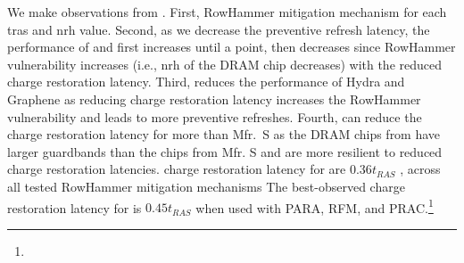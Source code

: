 We make  observations from . 
First, \Xh{}    RowHammer mitigation mechanism for each  \gls{tras} and \gls{nrh} value. 
Second, as we decrease the preventive refresh latency, the performance of \Xh{} and \Xs{} first increases until a point, then decreases since RowHammer vulnerability increases (i.e., \gls{nrh} of the DRAM chip decreases) with the reduced charge restoration latency. 
Third, \Xs{} reduces the performance of Hydra and Graphene as reducing charge restoration latency increases the RowHammer vulnerability and leads to more preventive refreshes.
Fourth, \X{} can reduce the charge restoration latency for  more than Mfr.~S as the DRAM chips from  have larger  guardbands than the chips from Mfr. S and  are more resilient to reduced charge restoration latencies.
 
charge restoration latency for \Xh{}  are $0.36t_{RAS}$ , across all tested RowHammer mitigation mechanisms The best-observed charge restoration latency for \Xs{} is $0.45t_{RAS}$ when used with PARA, RFM, and PRAC.\footnote{}

